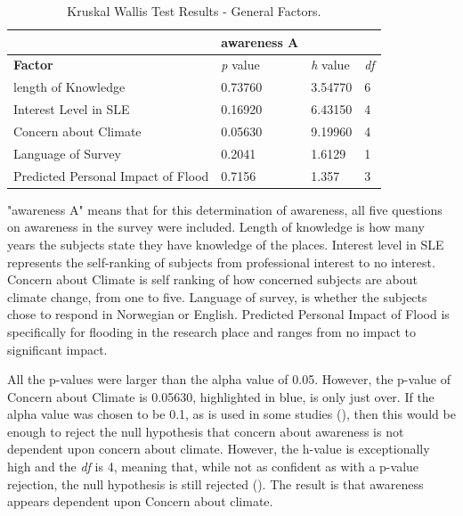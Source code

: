 \begin{table}[H]
    \centering
    \begin{tabular}{|l|l|l|l|}
    \hline
         ~ & \textbf{awareness A} & ~ & ~ \\ \hline
        \textbf{Factor} &\textit{p} value &\textit{h} value & \textit{df} \\ \hline
           length of Knowledge & 0.73760 & 3.54770 & 6 \\ \hline
       Interest Level in SLE & 0.16920 & 6.43150 & 4 \\ \hline
        Concern about Climate & \cellcolor[HTML]{7df9ff} 0.05630 & \cellcolor[HTML]{7df9ff} 9.19960 & \cellcolor[HTML]{7df9ff} 4 \\ \hline
        Language of Survey & 0.2041 & 1.6129 & 1 \\ \hline
        Predicted Personal Impact of Flood & 0.7156 & 1.357 & 3 \\ \hline
    \end{tabular}
    \caption{Kruskal Wallis Test Results - General Factors.}{ "awareness A" means that for this determination of awareness, all five questions on awareness in the survey were included. Length of knowledge is how many years the subjects state they have knowledge of the places. Interest level in SLE represents the self-ranking of subjects from professional interest to no interest. Concern about Climate is self ranking of how concerned subjects are about climate change, from one to five. Language of survey, is whether the subjects chose to respond in Norwegian or English. Predicted Personal Impact of Flood is specifically for flooding in the research place and ranges from no impact to significant impact. }
    \label{kw_test_general_factors}
\end{table}

All the p-values were larger than the alpha value of 0.05. However, the p-value of Concern about Climate is 0.05630, highlighted in blue, is only just over.  If the alpha value was chosen to be 0.1, as is used in some studies (\cite{hollander_nonparametric_2014}), then this would be enough to reject the null hypothesis that concern about awareness is not dependent upon concern about climate. However, the h-value is exceptionally high and the \textit{df} is 4, meaning that, while not as confident as with a p-value rejection, the null hypothesis is still rejected (\cite{minitab_interpret_2022}). The result is that awareness appears dependent upon Concern about climate. 
\paragraph{}


